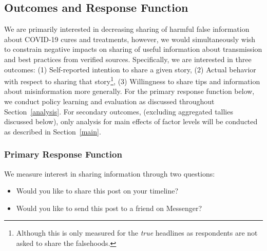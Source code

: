 \documentclass[letterpaper, 12pt, parskip=full,]{scrartcl}
\begin{document}





\subsection{Outcomes and Response Function}\label{response}

We are primarily interested in decreasing sharing of harmful false information about COVID-19 cures and treatments, however, we would simultaneously wish to constrain negative impacts on sharing of useful information about transmission and best practices from verified sources. Specifically, we are interested in three outcomes: (1) Self-reported intention to share a given story, (2) Actual behavior with respect to sharing that story\footnote{Although this is only measured for the \textit{true} headlines as respondents are not asked to share the falsehoods.}, (3) Willingness to share tips and information about misinformation more generally. For the primary response function below, we conduct policy learning and evaluation as discussed throughout Section~\ref{analysis}. For secondary outcomes, (excluding aggregated tallies discussed below), only analysis for main effects of factor levels will be conducted as described in Section~\ref{main}.  

\subsubsection{Primary Response Function}%

We measure interest in sharing information through two questions:
\begin{itemize}
\item Would you like to share this post on your timeline? 
\item Would you like to send this post to a friend on Messenger?
\end{itemize}
\end{document}
